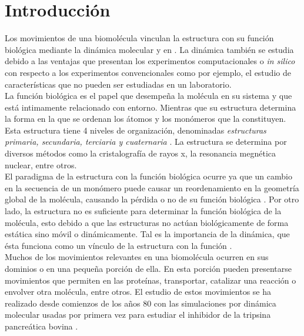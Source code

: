 \chapter*{Introducci\'{o}n}\label{ch:1}
Los movimientos de una biomol\'{e}cula vinculan la estructura con su funci\'{o}n biol\'{o}gica mediante la din\'{a}mica molecular \cite{Lezon2009} y en  \cite{Rader2006}. La din\'{a}mica tambi\'{e}n se estudia debido a las ventajas que presentan los experimentos computacionales o \textit{in silico} con respecto a los experimentos convencionales como por ejemplo, el estudio de caracter\'{i}sticas que no pueden ser estudiadas en un laboratorio.\\

La funci\'{o}n biol\'{o}gica es el papel que desempe\~{n}a la mol\'{e}cula en su sistema y que est\'{a} intimamente relacionado con entorno. Mientras que su estructura determina la forma en la que se ordenan los \'{a}tomos y los mon\'{o}meros que la constituyen. Esta estructura tiene 4 niveles de organizaci\'{o}n, denominadas \textit{estructuras primaria, secundaria, terciaria y cuaternaria} \cite{Kuchel}. La estructura se determina por diversos m\'{e}todos como la cristalograf\'{i}a de rayos x, la resonancia megn\'{e}tica nuclear, entre otros.\\

El paradigma de la estructura con la funci\'{o}n biol\'{o}gica ocurre ya que un cambio en la secuencia de un mon\'{o}mero puede causar un reordenamiento en la geometr\'{i}a global de la mol\'{e}cula, causando la p\'{e}rdida o no de su funci\'{o}n biol\'{o}gica \cite{Dykeman2010NormalPhysics}. Por otro lado, la estructura no es suficiente para determinar la funci\'{o}n biol\'{o}gica de la mol\'{e}cula, esto debido a que las estructuras no act\'{u}an biol\'{o}gicamente de forma est\'{a}tica sino m\'{o}vil o din\'{a}micamente. Tal es  la importancia de la din\'{a}mica, que \'{e}sta funciona como un v\'{i}nculo de la estructura con la funci\'{o}n \cite{Bahar2005Coarse-grainedBiology}.\\

Muchos de los movimientos relevantes en una biomol\'{e}cula ocurren en sus dominios o en una peque\~{n}a porci\'{o}n de ella. En esta porci\'{o}n pueden presentarse movimientos que permiten en las prote\'{i}nas, transportar, catalizar una reacci\'{o}n o envolver otra mol\'{e}cula, entre otros. El estudio de estos movimientos se ha realizado desde comienzos de los a\~{n}os 80 con las simulaciones por din\'{a}mica molecular usadas por primera vez para estudiar el inhibidor de la tripsina pancre\'{a}tica bovina  \cite{Bahar2005Coarse-grainedBiology}.\\

